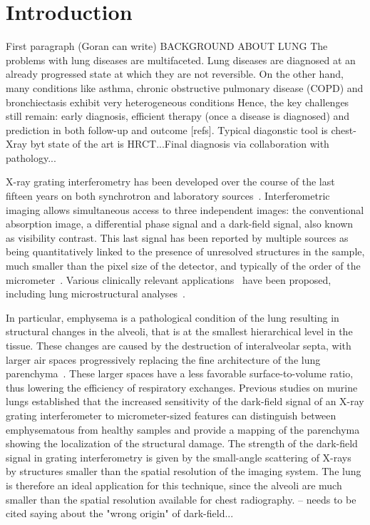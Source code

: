 \section{Introduction}\label{sec:introduction}
First paragraph (Goran can write) BACKGROUND ABOUT LUNG
The problems with lung diseases are multifaceted. Lung diseases are diagnosed at an already progressed state at which they are not reversible. On the other hand, many conditions like asthma, chronic obstructive pulmonary disease (COPD) and bronchiectasis exhibit very heterogeneous conditions Hence, the key challenges still remain: early diagnosis, efficient therapy (once a disease is diagnosed) and prediction in both follow-up and outcome [refs]. Typical diagonstic tool is chest-Xray byt state of the art is HRCT...Final diagnosis via collaboration with pathology...

X-ray grating interferometry has been developed over the course of the last
  fifteen years on both synchrotron and laboratory
sources~\cite{David_2002,1347-4065-42-7B-L866,Weitkamp_2005,1347-4065-45-6R-5254,Pfeiffer2006}. Interferometric
imaging allows simultaneous access to three independent images: the
conventional absorption image, a differential phase signal and a dark-field
signal, also known as visibility contrast. This last signal has been
reported by multiple sources as being quantitatively linked to the presence
of unresolved structures in the sample, much smaller than the pixel size of
the detector, and typically of the order of the
micrometer~\cite{Pfeiffer2008,Lynch:11,Yashiro:10}.
Various clinically relevant
applications~\cite{Wen_2009,Thilo2013} have been
proposed, including lung microstructural analyses~\cite{Schleede17880,Meinel_2014,Meinel_2013,Yaroshenko_2013,Modregger2016}.

In particular, emphysema is a pathological condition of the lung
resulting in structural changes in the alveoli, that is at the smallest
hierarchical level in the tissue. These changes are caused by the
destruction of interalveolar septa, with larger air spaces progressively
replacing the fine architecture of the lung parenchyma~\cite{Sharafkhaneh_2008}. These larger spaces
have a less favorable surface-to-volume ratio, thus lowering the efficiency
of respiratory exchanges. Previous studies on murine lungs established that the increased sensitivity of
the dark-field signal of an X-ray grating interferometer to micrometer-sized
features can distinguish between emphysematous from healthy samples and
provide a mapping of the parenchyma showing the localization of the
structural damage. The strength of the dark-field signal in grating interferometry is
given by the small-angle scattering of X-rays by structures smaller than the
spatial resolution of the imaging system. The lung is therefore an ideal
application for this technique, since the alveoli are much
smaller than the spatial resolution available for chest radiography. -- \cite{Koenig2016} needs to be cited saying about the "wrong origin" of dark-field...

